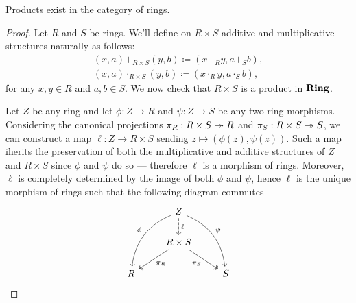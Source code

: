 %
\begin{proposition}[Product]
\label{prop:product-ring}
Products exist in the category of rings.
\end{proposition}
%

%
\begin{proof}
Let \(R\) and \(S\) be rings. We'll define on \(R \times S\) additive and
multiplicative structures naturally as follows:
\begin{gather*}
(x, a) +_{R \times S} (y, b)     \coloneq (x +_R y, a +_S b), \\
(x, a) \cdot_{R \times S} (y, b) \coloneq (x \cdot_R y, a \cdot_S b),
\end{gather*}
for any \(x, y \in R\) and \(a, b \in S\). We now check that \(R \times S\) is a
product in \({\textbf{Ring}}\).

Let \(Z\) be any ring and let \(\phi: Z \to R\) and \(\psi: Z \to S\) be any two
ring morphisms. Considering the canonical projections \(\pi_R: R \times S \twoheadrightarrow
R\) and \(\pi_S: R \times S \twoheadrightarrow S\), we can construct a map \(\ell: Z \to R
\times S\) sending \(z \mapsto (\phi(z), \psi(z))\). Such a map iherits the
preservation of both the multiplicative and additive structures of \(Z\) and \(R
\times S\) since \(\phi\) and \(\psi\) do so --- therefore \(\ell\) is a
morphism of rings. Moreover, \(\ell\) is completely determined by the image of
both \(\phi\) and \(\psi\), hence \(\ell\) is the unique morphism of rings such
that the following diagram commutes
\[
\begin{tikzcd}
&Z \ar[ddl, bend right, swap, "\phi"]
\ar[ddr, bend left, "\psi"]
\ar[d, dashed, "\ell"] & \\
&R \times S \ar[ld, two heads, "\pi_R"]
\ar[rd, two heads, swap, "\pi_S"] &\\
R & &S
\end{tikzcd}
\]
\end{proof}
%

